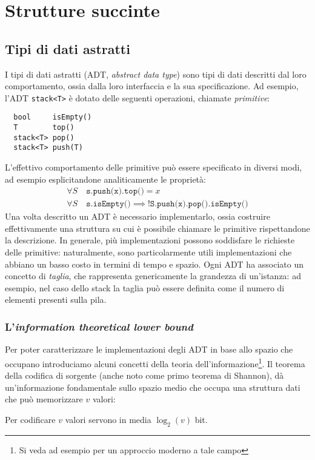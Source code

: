 \chapter{Strutture succinte}



\section{Tipi di dati astratti}
I tipi di dati astratti (ADT, \textit{abstract data type}) sono tipi di dati descritti dal loro comportamento, ossia dalla loro interfaccia e la sua specificazione.
Ad esempio, l'ADT \texttt{stack<T>} è dotato delle seguenti operazioni, chiamate \emph{primitive}:
\begin{verbatim}
  bool     isEmpty()
  T        top()
  stack<T> pop()
  stack<T> push(T)
\end{verbatim}
L'effettivo comportamento delle primitive può essere specificato in diversi modi, ad esempio esplicitandone analiticamente le proprietà:
\begin{gather*}
	\forall S\quad \texttt{s.push(x).top()} = x \\
	\forall S\quad \texttt{s.isEmpty()} \implies \texttt{!S.push(x).pop().isEmpty()}
\end{gather*}
Una volta descritto un ADT è necessario implementarlo, ossia costruire effettivamente una struttura su cui è possibile chiamare le primitive rispettandone la descrizione.
In generale, più implementazioni possono soddisfare le richieste delle primitive: naturalmente, sono particolarmente utili implementazioni che abbiano un basso costo in termini di tempo e spazio.
Ogni ADT ha associato un concetto di \emph{taglia}, che rappresenta genericamente la grandezza di un'istanza: ad esempio, nel caso dello stack la taglia può essere definita come il numero di elementi presenti sulla pila.


\subsection{L'\textit{information theoretical lower bound}}
Per poter caratterizzare le implementazioni degli ADT in base allo spazio che occupano introduciamo alcuni concetti della teoria dell'informazione\footnote{Si veda ad esempio \cite{Cover:06:informtheory} per un approccio moderno a tale campo}.
Il teorema della codifica di sorgente \cite{Shannon:48:theorycommu} (anche noto come primo teorema di Shannon), dà un'informazione fondamentale sullo spazio medio che occupa una struttura dati che può memorizzare $v$ valori:
\begin{theorem}
	\label{thm:shannon}
	Per codificare $v$ valori servono in media $\log_2(v)$ bit.
\end{theorem}

